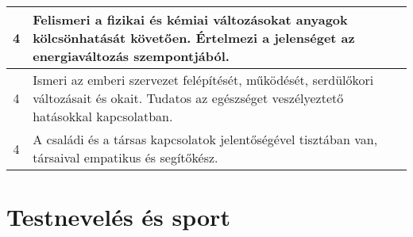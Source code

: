 \begin{longtable}{c | p{} }
                                
                                          4 &  Felismeri a fizikai és kémiai változásokat anyagok kölcsönhatását követően. Értelmezi a jelenséget az energiaváltozás szempontjából. \\ \hline
                                          4 &  Ismeri az emberi szervezet felépítését, működését, serdülőkori változásait és okait. Tudatos az egészséget veszélyeztető hatásokkal kapcsolatban. \\ \hline
                                          4 &  A családi és a társas kapcsolatok jelentőségével tisztában van, társaival empatikus és segítőkész. \\ \hline
                                      
                        \end{longtable}
            \clearpage

        \section{Testnevelés és sport}

